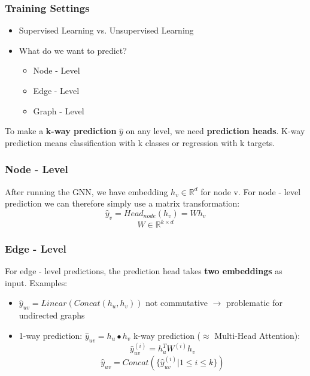 \documentclass[parskip=full]{scrartcl}
\begin{document}
\subsubsection{Training Settings}
\begin{itemize}[noitemsep]
	\item Supervised Learning vs. Unsupervised Learning
	\item What do we want to predict?
	\begin{itemize}[noitemsep]
		\item Node - Level
		\item Edge - Level
		\item Graph - Level
	\end{itemize}
\end{itemize}

To make a \textbf{k-way prediction} $\hat{y}$ on any level, we need \textbf{prediction heads}. K-way prediction means classification with k classes or regression with k targets.

\subsubsection{Node - Level}
After running the GNN, we have embedding $h_v \in \mathbb{R}^d$ for node v. For node - level prediction we can therefore simply use a matrix transformation:
\[\hat{y}_v = Head_{node}(h_v) = Wh_v\]
\[W \in \mathbb{R}^{k \times d}\]

\subsubsection{Edge - Level}
For edge - level predictions, the prediction head takes \textbf{two embeddings} as input. \newline
Examples:
\begin{itemize}
	\item $\hat{y}_{uv} = Linear(Concat(h_u, h_v))$ \newline
		not commutative $\rightarrow$ problematic for undirected graphs
	\item 1-way prediction: $\hat{y}_{uv} = h_u \bullet h_v$ \newline
		k-way prediction ($\approx$ Multi-Head Attention):
		\[\hat{y}_{uv}^{(i)} = h_u^TW^{(i)}h_v\]
		\[\hat{y}_{uv} = Concat(\{\hat{y}_{uv}^{(i)} | 1 \leqslant i \leqslant k\})\]
\end{itemize}
\end{document}

